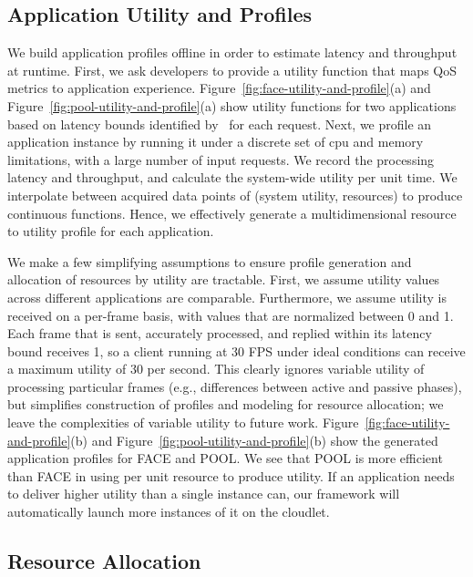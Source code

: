 \subsection{Application Utility and Profiles}

We build application profiles offline in order to estimate latency and
throughput at runtime. First, we ask developers to provide a utility
function that maps QoS metrics to application experience.
Figure~\ref{fig:face-utility-and-profile}(a) and
Figure~\ref{fig:pool-utility-and-profile}(a) show utility functions
for two applications based on latency bounds identified
by~\cite{Chen2017} for each request. Next, we profile an application
instance by running it under a discrete set of cpu and memory
limitations, with a large number of input requests. We record the
processing latency and throughput, and calculate the system-wide
utility per unit time. We interpolate between acquired data points of
(system utility, resources) to produce continuous functions.  Hence,
we effectively generate a multidimensional resource to utility profile
for each application.

We make a few simplifying assumptions to ensure profile generation and
allocation of resources by utility are tractable.  First, we assume
utility values across different applications are comparable.
Furthermore, we assume utility is received on a per-frame basis, with
values that are normalized between 0 and 1.  Each frame that is sent,
accurately processed, and replied within its latency bound receives 1,
so a client running at 30 FPS under ideal conditions can receive a
maximum utility of 30 per second.  This clearly ignores variable
utility of processing particular frames (e.g., differences between
active and passive phases), but simplifies construction of profiles
and modeling for resource allocation; we leave the complexities of
variable utility to future work.
Figure~\ref{fig:face-utility-and-profile}(b) and
Figure~\ref{fig:pool-utility-and-profile}(b) show the generated
application profiles for FACE and POOL. We see that POOL is more efficient
than FACE in using per unit resource to produce utility. If an
application needs to deliver higher utility than a single instance
can, our framework will automatically launch more instances of it on
the cloudlet.


\subsection{Resource Allocation}

